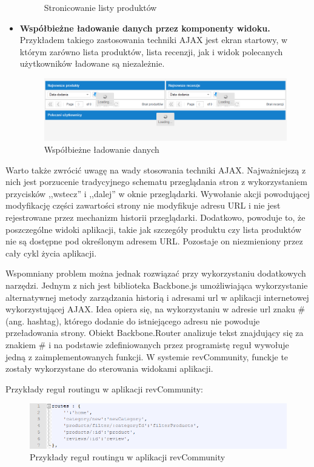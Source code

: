 \begin{itemize}
\begin{figure}[H]
	\caption{Stronicowanie listy produktów}
\end{figure}
\item\textbf{Współbieżne ładowanie danych przez komponenty widoku.} Przykładem takiego zastosowania techniki AJAX jest ekran startowy, w którym zarówno lista produktów, lista recenzji, jak i widok polecanych użytkowników ładowane są niezależnie.
\begin{figure}[H]
	\centering
	\includegraphics[width=\textwidth]{images/Loading.png}
	\caption{Współbieżne ładowanie danych}
\end{figure}
\end{itemize}


Warto także zwrócić uwagę na wady stosowania techniki AJAX. Najważniejszą z nich jest porzucenie tradycyjnego schematu przeglądania stron z wykorzystaniem przycisków ,,wstecz'' i ,,dalej'' w oknie przeglądarki. Wywołanie akcji powodującej modyfikację części zawartości strony nie modyfikuje adresu URL i nie jest rejestrowane przez mechanizm historii przeglądarki. Dodatkowo, powoduje to, że poszczególne widoki aplikacji, takie jak szczegóły produktu czy lista produktów nie są dostępne pod określonym adresem URL. Pozostaje on niezmieniony przez cały cykl życia aplikacji.\cite{jsadv}

Wspomniany problem można jednak rozwiązać przy wykorzystaniu dodatkowych narzędzi. Jednym z nich jest biblioteka Backbone.js umożliwiająca wykorzystanie alternatywnej metody zarządzania historią i adresami url w aplikacji internetowej wykorzystującej AJAX. Idea opiera się, na wykorzystaniu w adresie url znaku \# (ang. hashtag), którego dodanie do istniejącego adresu nie powoduje przeładowania strony.\cite{urls} Obiekt Backbone.Router analizuje tekst znajdujący się za znakiem \# i na podstawie zdefiniowanych przez programistę reguł wywołuje jedną z zaimplementowanych funkcji. W systemie revCommunity, funckje te zostały wykorzystane do sterowania widokami aplikacji.\cite{backbone}

Przykłady reguł routingu w aplikacji revCommunity:

\begin{figure}[H]
	\centering
	\includegraphics[width=\textwidth]{images/routes.png}
	\caption{Przykłady reguł routingu w aplikacji revCommunity}
\end{figure}

